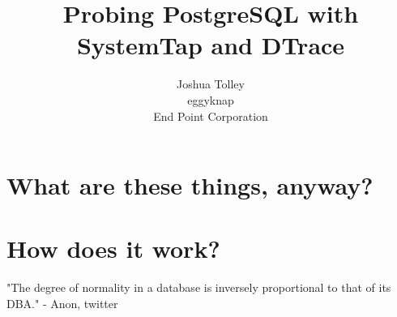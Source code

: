 \documentclass{beamer}
\begin{document}
\title{Probing PostgreSQL with SystemTap and DTrace}
\author{Joshua Tolley\\
        eggyknap\\
    End Point Corporation
}


\frame{\titlepage}
\frame{\tableofcontents}

\section{What are these things, anyway?}
\begin{frame}
\end{frame}

\section{How does it work?}

\begin{frame}
"The degree of normality in a database is inversely proportional to that of its DBA."
- Anon, twitter
\end{frame}
\end{document}
